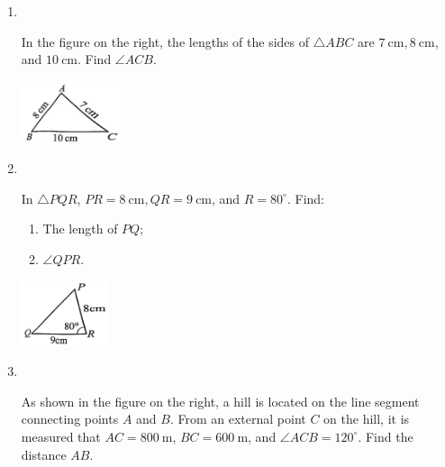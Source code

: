 \documentclass{report}
\begin{document}
    \begin{enumerate}
        \item \parbox[t]{0.9\textwidth}{
            ~
            \vspace{-1.1em}
            \begin{vwcol}[widths={0.7,0.3}, sep=8mm, rule=0pt]
                In the figure on the right, the lengths of the sides of $\triangle ABC$ are $7 \mathrm{~cm}, 8 \mathrm{~cm}$, and $10 \mathrm{~cm}$. Find $\angle ACB$.
    
                \includegraphics[width=0.23\textwidth]{assets/10-25.jpg}
            \end{vwcol}
        }

        \vspace{3em}
        \item \parbox[t]{0.9\textwidth}{
            ~
            \vspace{-1.1em}
            \begin{vwcol}[widths={0.7,0.3}, sep=8mm, rule=0pt]
                In $\triangle PQR$, $PR = 8 \mathrm{~cm}, QR = 9 \mathrm{~cm}$, and $R = 80^\circ$. Find:
                
                \noindent \parbox{0.3\textwidth}{
                    \begin{enumerate}
                        \item The length of $PQ$;
                        \item $\angle QPR$.
                    \end{enumerate}}
                \vfill\null
    
                \includegraphics[width=0.2\textwidth]{assets/10-26.jpg}
            \end{vwcol}
        }

        \item \parbox[t]{0.9\textwidth}{
            ~
            \vspace{-1.1em}
            \begin{vwcol}[widths={0.6,0.4}, sep=8mm, rule=0pt]
                As shown in the figure on the right, a hill is located on the line segment connecting points $A$ and $B$. From an external point $C$ on the hill, it is measured that $AC = 800 \mathrm{~m}$, $BC = 600 \mathrm{~m}$, and $\angle ACB = 120^\circ$. Find the distance $AB$.
    

\end{vwcol}}
\end{enumerate}
\end{document}
